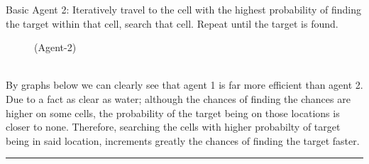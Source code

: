 \documentclass{article}
\theoremstyle{definition}
\def\fline{\rule{0.75\linewidth}{0.5pt}}
\newcommand{\finishline}{\begin{center}\fline\end{center}}
\begin{document}
Basic Agent 2:  Iteratively travel to the cell with the highest probability of finding the target within that cell, search that cell.  Repeat until the target is found.\\
\noindent
\begin{figure}[h!]	
		\caption{ (Agent-2)} 
\end{figure}\\	
By graphs below we can clearly see that agent 1 is far more efficient than agent 2. Due to a fact as clear as water; although the chances of finding the chances are higher on some cells, the probability of the target being on those locations is closer to none. Therefore, searching the cells with higher probabilty of target being in said location, increments greatly the chances of finding the target faster.  	


\finishline
\end{document}
